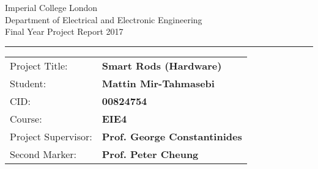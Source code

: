 \begin{titlepage}
                \setlength{\parindent}{0pt}
                \setlength{\parskip}{0pt}

                {
                                \Large
                                \raggedright
                                Imperial College London\\[17pt]
                                Department of Electrical and Electronic Engineering\\[17pt]
                                Final Year Project Report 2017\\[17pt]
 
                }

                \rule{\columnwidth}{3pt}
                \vfill
                \centering
                \vfill
                \setlength{\tabcolsep}{0pt}

                \begin{tabular}{p{40mm}p{\dimexpr\columnwidth-40mm}}
                                Project Title: & \textbf{Smart Rods (Hardware)} \\[12pt]
                                Student: & \textbf{Mattin Mir-Tahmasebi} \\[12pt]
                                CID: & \textbf{00824754} \\[12pt]
                                Course: & \textbf{EIE4} \\[12pt]
                                Project Supervisor: & \textbf{Prof. George Constantinides} \\[12pt]
                                Second Marker: & \textbf{Prof. Peter Cheung} \\
                \end{tabular}
\end{titlepage}